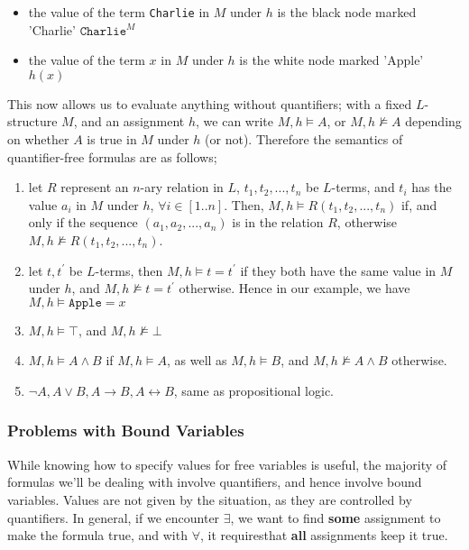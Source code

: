 \documentclass[a4paper, 12pt]{article}
\begin{document}
                \begin{itemize}
                    \itemsep0em
                    \item the value of the term \texttt{Charlie} in $M$ under $h$ is the black node marked 'Charlie' \hfill $\texttt{Charlie}^M$
                    \item the value of the term $x$ in $M$ under $h$ is the white node marked 'Apple' \hfill $h(x)$
                \end{itemize}
                This now allows us to evaluate anything without quantifiers; with a fixed $L$-structure $M$, and an assignment $h$, we can write $M, h \vDash A$, or $M, h \nvDash A$ depending on whether $A$ is true in $M$ under $h$ (or not). Therefore the semantics of quantifier-free formulas are as follows;
                \begin{enumerate}[1.]
                    \itemsep0em
                    \item let $R$ represent an $n$-ary relation in $L$, $t_1, t_2, ..., t_n$ be $L$-terms, and $t_i$ has the value $a_i$ in $M$ under $h$, $\forall i \in [1..n]$. Then, $M, h \vDash R(t_1, t_2, ..., t_n)$ if, and only if the sequence $(a_1, a_2, ..., a_n)$ is in the relation $R$, otherwise $M, h \nvDash R(t_1, t_2, ..., t_n)$.
                    \item let $t, t^\prime$ be $L$-terms, then $M, h \vDash t = t^\prime$ if they both have the same value in $M$ under $h$, and $M, h \nvDash t = t^\prime$ otherwise.
                        \subitem Hence in our example, we have $M, h \vDash \texttt{Apple} = x$
                    \item $M, h \vDash \top$, and $M,h \nvDash \bot$
                    \item $M, h \vDash A \land B$ if $M, h \vDash A$, as well as $M, h \vDash B$, and $M, h \nvDash A \land B$ otherwise.
                    \item $\neg A, A \lor B, A \rightarrow B, A \leftrightarrow B$, same as propositional logic.
                \end{enumerate}
            \subsubsection*{Problems with Bound Variables}
                While knowing how to specify values for free variables is useful, the majority of formulas we'll be dealing with involve quantifiers, and hence involve bound variables. Values are not given by the situation, as they are controlled by quantifiers. In general, if we encounter $\exists$, we want to find \textbf{some} assignment to make the formula true, and with $\forall$, it requiresthat \textbf{all} assignments keep it true.
                \medskip
\end{document}
